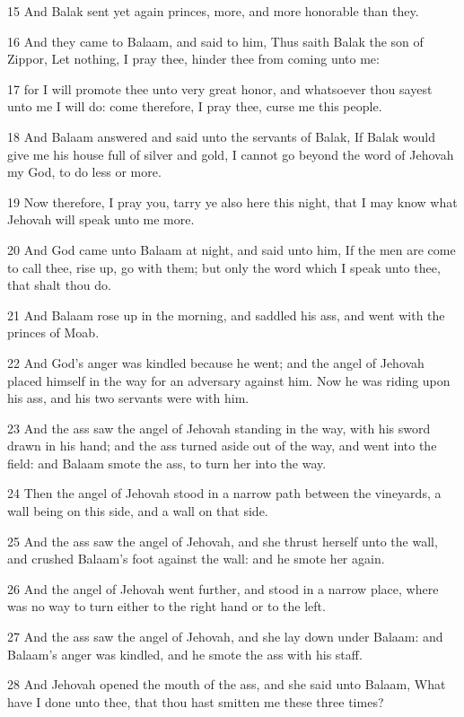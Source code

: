 \par 15 And Balak sent yet again princes, more, and more honorable than they.
\par 16 And they came to Balaam, and said to him, Thus saith Balak the son of Zippor, Let nothing, I pray thee, hinder thee from coming unto me:
\par 17 for I will promote thee unto very great honor, and whatsoever thou sayest unto me I will do: come therefore, I pray thee, curse me this people.
\par 18 And Balaam answered and said unto the servants of Balak, If Balak would give me his house full of silver and gold, I cannot go beyond the word of Jehovah my God, to do less or more.
\par 19 Now therefore, I pray you, tarry ye also here this night, that I may know what Jehovah will speak unto me more.
\par 20 And God came unto Balaam at night, and said unto him, If the men are come to call thee, rise up, go with them; but only the word which I speak unto thee, that shalt thou do.
\par 21 And Balaam rose up in the morning, and saddled his ass, and went with the princes of Moab.
\par 22 And God's anger was kindled because he went; and the angel of Jehovah placed himself in the way for an adversary against him. Now he was riding upon his ass, and his two servants were with him.
\par 23 And the ass saw the angel of Jehovah standing in the way, with his sword drawn in his hand; and the ass turned aside out of the way, and went into the field: and Balaam smote the ass, to turn her into the way.
\par 24 Then the angel of Jehovah stood in a narrow path between the vineyards, a wall being on this side, and a wall on that side.
\par 25 And the ass saw the angel of Jehovah, and she thrust herself unto the wall, and crushed Balaam's foot against the wall: and he smote her again.
\par 26 And the angel of Jehovah went further, and stood in a narrow place, where was no way to turn either to the right hand or to the left.
\par 27 And the ass saw the angel of Jehovah, and she lay down under Balaam: and Balaam's anger was kindled, and he smote the ass with his staff.
\par 28 And Jehovah opened the mouth of the ass, and she said unto Balaam, What have I done unto thee, that thou hast smitten me these three times?
